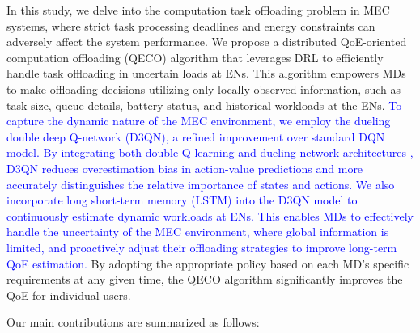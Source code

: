 \documentclass[12pt,draftclsnofoot,onecolumn]{IEEEtran}
\begin{document}
In this study, we delve into the computation task offloading problem in MEC systems, where strict task processing deadlines and energy constraints can adversely affect the system performance. We propose a distributed QoE-oriented computation offloading (QECO) algorithm that leverages DRL to efficiently handle task offloading in uncertain loads at ENs. This algorithm empowers MDs to make offloading decisions utilizing only locally observed information, such as task size, queue details, battery status, and historical workloads at the ENs. 
\textcolor{blue}{To capture the dynamic nature of the MEC environment, we employ the dueling double deep Q-network (D3QN), a refined improvement over standard DQN model. By integrating both double Q-learning \cite{van2016deep} and dueling network architectures \cite{wang2016dueling}, D3QN reduces overestimation bias in action-value predictions and more accurately distinguishes the relative importance of states and actions. We also incorporate long short-term memory (LSTM) \cite{hochreiter1997long} into the D3QN model to continuously estimate dynamic workloads at ENs. This enables MDs to effectively handle the uncertainty of the MEC environment, where global information is limited, and proactively adjust their offloading strategies to improve long-term QoE estimation.} By adopting the appropriate policy based on each MD’s specific requirements at any given time, the QECO algorithm significantly improves the QoE for individual users. 

Our main contributions are summarized as follows:
\end{document}
